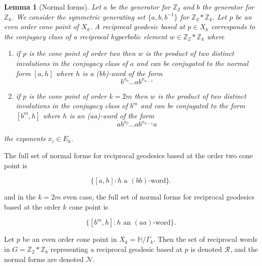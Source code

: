 \documentclass[11pt]{amsart}
\numberwithin{equation}{section}
\theoremstyle{plain}
\newtheorem{lem}[thm]{Lemma}
\begin{document}
\begin{lem}[Normal forms]\label{lem: normal forms}
  Let $a$ be  the generator for  
$\mathbb{Z}_{2}$ and  $b$ the  generator for  $\mathbb{Z}_{k}$. We consider the 
symmetric generating set $\{a, b, b^{-1}\}$ for 
$\mathbb{Z}_{2} \ast \mathbb{Z}_{k}$. Let $p$ be an even order cone point of $X_{k}$.
A  reciprocal geodesic based at $p \in X_{k}$ corresponds to the conjugacy class of a reciprocal hyperbolic  element $w \in \mathbb{Z}_{2} \ast \mathbb{Z}_{k}$ where


\begin{enumerate}
\item if $p$ is the cone point of order two then $w$ is the  product of two distinct  involutions in the conjugacy class of  $a$ 
 and can be  conjugated to the  normal form  $[a,h]$ where
 $h$ is a   (bb)-word of the form
\begin{equation*} 
b^{x_0}\dots ab^{x_{n-1}}
\end{equation*}
  

\item if $p$ is the cone point of order $k=2m$ then $w$ is the product of two distinct involutions in the conjugacy class of  $b^{m}$ 
and  can be conjugated to the form
$[b^{m}, h]$ where $h$  is an (aa)-word of the form
\begin{equation*}
ab^{x_0}\dots ab^{x_{n-1}}a
\end{equation*}
\end{enumerate}

the exponents   $x_i \in E_k$. 

\end{lem}
The  full set of normal forms for reciprocal geodesics based at the order two cone point is



\begin{equation*} \{[a,h] : h\,\, \textrm{a $(bb)$-word}\}.
\end{equation*} 

and in the $k=2m$ even case, the   full set of normal forms for reciprocal geodesics based at the order $k$  cone point is


\begin{equation*} \{[b^{m},h] : h\,\, \textrm{an $(aa)$-word}\}.
\end{equation*} 


Let $p$ be an even order cone point in $X_{k}=\mathbb{H}/\Gamma_{k}.$ Then the set of reciprocal words in 
$G=\mathbb{Z}_2 \ast \mathbb{Z}_k$ representing a reciprocal geodesic based at $p$ is denoted $\mathcal{R}$, and the normal forms are denoted  $\mathcal{N}$.
\end{document}

